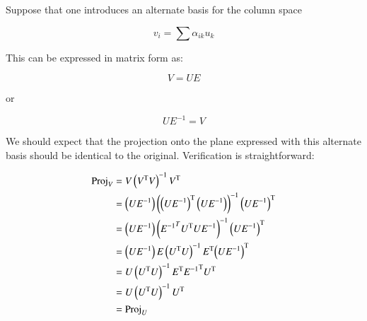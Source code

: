 \documentclass{article}      %
\newcommand{\T}[0]{\text{T}}
\begin{document}
Suppose that one introduces an alternate basis for the column space


\[
v_i = \sum \alpha_{ik} u_k
\]

This can be expressed in matrix form as:

\[
V = U E
\]

or

\[
U E^{-1} = V
\]

We should expect that the projection onto the plane expressed with this alternate basis should be identical to the original.  Verification
is straightforward:

\begin{align*}
\Proj_V 
&= V \left(V^\T V\right)^{-1} V^\T \\
&= \left(U E^{-1}\right) \left({\left(U E^{-1}\right)}^\T \left(U E^{-1}\right)\right)^{-1} {\left(U E^{-1}\right)}^\T \\
&= \left(U E^{-1}\right) \left( {E^{-1}}^T U^\T U E^{-1}\right)^{-1} {\left(U E^{-1}\right)}^\T \\
&= \left(U E^{-1}\right) E \left( U^\T U\right)^{-1} E^\T {\left(U E^{-1}\right)}^\T \\
&= U \left( U^\T U\right)^{-1} E^\T {E^{-1}}^\T U^\T \\
&= U \left( U^\T U\right)^{-1} U^\T \\
&= \Proj_U
\end{align*}
\end{document}
